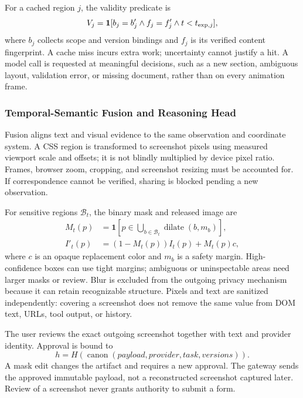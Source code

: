 \documentclass[conference]{IEEEtran}
\begin{document}
For a cached region $j$, the validity predicate is
\begin{equation}
 V_j=\mathbf{1}[b_j=b'_j\land f_j=f'_j\land t<t_{{\rm exp},j}],
\end{equation}
where $b_j$ collects scope and version bindings and $f_j$ is its verified content fingerprint. A cache miss incurs extra work; uncertainty cannot justify a hit. A model call is requested at meaningful decisions, such as a new section, ambiguous layout, validation error, or missing document, rather than on every animation frame.

\subsubsection{Temporal-Semantic Fusion and Reasoning Head}
Fusion aligns text and visual evidence to the same observation and coordinate system. A CSS region is transformed to screenshot pixels using measured viewport scale and offsets; it is not blindly multiplied by device pixel ratio. Frames, browser zoom, cropping, and screenshot resizing must be accounted for. If correspondence cannot be verified, sharing is blocked pending a new observation.

For sensitive regions $\mathcal{B}_t$, the binary mask and released image are
\begin{align}
 M_t(p)&=\mathbf{1}\left[p\in\bigcup_{b\in\mathcal{B}_t}\operatorname{dilate}(b,m_b)\right],\\
 I'_t(p)&=(1-M_t(p))I_t(p)+M_t(p)c,
\end{align}
where $c$ is an opaque replacement color and $m_b$ is a safety margin. High-confidence boxes can use tight margins; ambiguous or uninspectable areas need larger masks or review. Blur is excluded from the outgoing privacy mechanism because it can retain recognizable structure. Pixels and text are sanitized independently: covering a screenshot does not remove the same value from DOM text, URLs, tool output, or history.

The user reviews the exact outgoing screenshot together with text and provider identity. Approval is bound to
\begin{equation}
 h=H(\operatorname{canon}(payload,provider,task,versions)).
\end{equation}
A mask edit changes the artifact and requires a new approval. The gateway sends the approved immutable payload, not a reconstructed screenshot captured later. Review of a screenshot never grants authority to submit a form.
\end{document}
